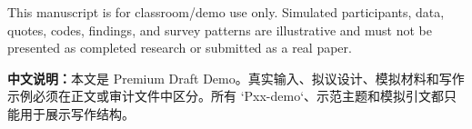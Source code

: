 \begin{tcolorbox}[noticebox,title={Draft Demo Notice}]
This manuscript is for classroom/demo use only. Simulated participants, data, quotes, codes, findings, and survey patterns are illustrative and must not be presented as completed research or submitted as a real paper.

\medskip
\textbf{中文说明：}本文是 Premium Draft Demo。真实输入、拟议设计、模拟材料和写作示例必须在正文或审计文件中区分。所有 `Pxx-demo`、示范主题和模拟引文都只能用于展示写作结构。
\end{tcolorbox}
